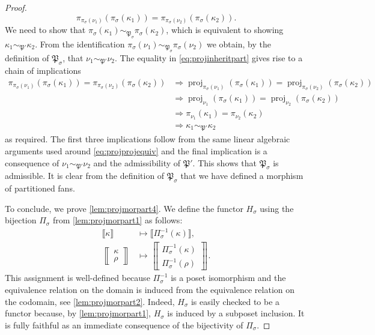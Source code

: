 \documentclass[10pt,twoside, a4paper,reqno]{amsart}
\DeclareMathOperator{\proj}{proj}
\newcommand{\eqclass}[1]{ \llbracket #1 \rrbracket }
\newcommand{\sqbinom}[2]{\left\llbracket \!\begin{smallmatrix} #1 \\ #2 \end{smallmatrix}\!\right\rrbracket}
\newcommand{\Pfrak}{\mathfrak{P}}
\theoremstyle{definition}
\begin{document}
\begin{proof}
{   \begin{equation}\label{eq:projinheritpart} \pi_{ \pi_{\sigma}(\nu_1)}(\pi_{\sigma}(\kappa_1)) = \pi_{\pi_{\sigma}(\nu_2)}(\pi_{\sigma}(\kappa_2)). \end{equation}
   We need to show that $\pi_{\sigma}(\kappa_1) \sim_{\Pfrak_{\sigma}} \pi_{\sigma}(\kappa_2)$, which is equivalent to showing $\kappa_1 \sim_{\Pfrak'} \kappa_2$. From the identification $\pi_{\sigma}(\nu_1) \sim_{\Pfrak_{\sigma}} \pi_{\sigma}(\nu_2)$ we obtain, by the definition of $\Pfrak_\sigma$, that $\nu_1 \sim_{\Pfrak'} \nu_2$. The equality in \cref{eq:projinheritpart} gives rise to a chain of implications
   \begin{align*}
   	\pi_{ \pi_{\sigma}(\nu_1)}(\pi_{\sigma}(\kappa_1)) = \pi_{\pi_{\sigma}(\nu_2)}(\pi_{\sigma}(\kappa_2)) & \Rightarrow \proj_{\pi_{\sigma}(\nu_1)}(\pi_{\sigma}(\kappa_1)) = \proj_{\pi_{\sigma}(\nu_2)}(\pi_{\sigma}(\kappa_2)) \\
	& \Rightarrow \proj_{\nu_1} (\pi_{\sigma}(\kappa_1)) = \proj_{\nu_2} (\pi_{\sigma}(\kappa_2)) \\
	& \Rightarrow \pi_{\nu_1}(\kappa_1) = \pi_{\nu_2}(\kappa_2) \\
	& \Rightarrow \kappa_1 \sim_{\Pfrak'} \kappa_2
   \end{align*}
   as required. The first three implications follow from the same linear algebraic arguments used around \cref{eq:projprojequiv} and the final implication is a consequence of $\nu_1 \sim_{\Pfrak'} \nu_2$ and the admissibility of $\Pfrak'$. This shows that $\Pfrak_{\sigma}$ is admissible. }
     It is clear from the definition of $\Pfrak_{\sigma}$ that we have defined a morphism of partitioned fans. 

     To conclude, we prove \eqref{lem:projmorpart4}. We define the functor $H_{\sigma}$ {using the bijection $\Pi_{\sigma}$ from \eqref{lem:projmorpart1} as follows}:
    \begin{align*}
        \eqclass{{\kappa}} &\mapsto \eqclass{\Pi_{\sigma}^{-1}(\kappa)}, \\
        \sqbinom{{\kappa}}{\rho} &\mapsto \sqbinom{\Pi_{\sigma}^{-1}(\kappa)}{\Pi_{\sigma}^{-1}(\rho)}.
    \end{align*}
    {This assignment is well-defined because $\Pi_{\sigma}^{-1}$ is a poset isomorphism and the equivalence relation on the domain is induced from the equivalence relation on the codomain, see \eqref{lem:projmorpart2}.
    Indeed, $H_{\sigma}$ is easily checked to be a functor because, by \eqref{lem:projmorpart1}, $H_{\sigma}$ {is induced by} a subposet inclusion. It is fully faithful as an immediate consequence of the bijectivity of $\Pi_{\sigma}$.}
\end{proof}
\end{document}
